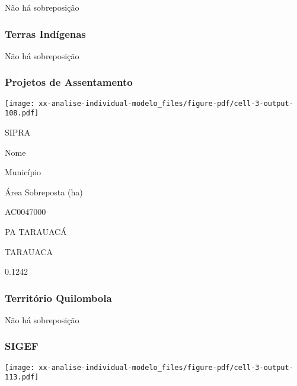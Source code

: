 \documentclass[
  11pt,
  a4paper,
  DIV=11,
  numbers=noendperiod]{scrartcl}
\begin{document}
Não há sobreposição

\subsubsection{Terras Indígenas}\label{terras-induxedgenas-5}

Não há sobreposição

\subsubsection{Projetos de
Assentamento}\label{projetos-de-assentamento-5}

\texttt{[image: xx-analise-individual-modelo\_files/figure-pdf/cell-3-output-108.pdf]}

\n  

\n    

\n      

SIPRA

\n      

Nome

\n      

Município

\n      

Área Sobreposta (ha)

\n    

\n  

\n  

\n    

\n      

AC0047000

\n      

PA TARAUACÁ

\n      

TARAUACA

\n      

0.1242

\n    

\n  

\n

\subsubsection{Território Quilombola}\label{territuxf3rio-quilombola-5}

Não há sobreposição

\subsubsection{SIGEF}\label{sigef-5}

\texttt{[image: xx-analise-individual-modelo\_files/figure-pdf/cell-3-output-113.pdf]}
\end{document}
